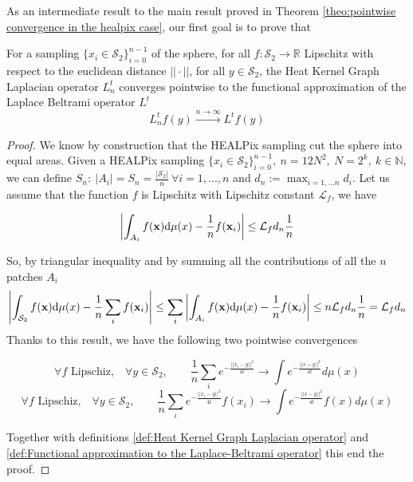 As an intermediate result to the main result proved in Theorem \ref{theo:pointwise convergence in the healpix case}, our first goal is to prove that 
\vspace{0.5cm}
\begin{prop}\label{prop:1}
	For a sampling $\{x_i\in\mathcal S_2\}_{i=0}^{n-1}$ of the sphere, for all $f: \mathcal S_2 \rightarrow \mathbb R$ Lipschitz with respect to the euclidean distance $||\cdot||$, for all $y\in\mathcal S_2$, the Heat Kernel Graph Laplacian operator $L^t_n$ converges pointwise to the functional approximation of the Laplace Beltrami operator $L^t$
	$$ L_n^tf(y)\xrightarrow{n\to\infty} L^tf(y)$$
\end{prop} 
\vspace{0.5cm}


\begin{proof}
	We know by construction that the HEALPix sampling cut the sphere into equal areas. Given a HEALPix sampling $\{x_i\in\mathcal S_2\}_{i=0}^{n-1},\ n=12N^2,\ N=2^k,\ k\in\mathbb N$, we can define $S_n: \ |A_i|=S_n=\frac{|\mathcal S_2|}{n}\ \forall i=1, ..., n$ and $d_n := \max_{i=1,...n}d_i$.
	Let us assume that the function $f$ is Lipschitz with Lipschitz constant $\mathcal L_f$, we have 
	
	$$\left| \int_{A_{i}}f({\bf x})\text{d}{\mu(x)} - \frac{1}{n}f(\mathbf x_i)\right| \leq \mathcal L_fd_{n}\frac{1}{n} $$

	So, by triangular inequality and by summing all the contributions of all the $n$ patches $A_i$
	$$\left| \int_{\mathcal S_2}f({\bf x})\text{d}{\mu(x)} - \frac{1}{n}\sum_i f(\mathbf x_i)\right| \leq \sum_i \left| \int_{A_{i}}f({\bf x})\text{d}{\mu(x)} - \frac{1}{n}f(\mathbf x_i)\right|\leq n  \mathcal L_fd_{n}\frac{1}{n} = \mathcal L_fd_{n}$$	
	Thanks to this result, we have the following two pointwise convergences
	
	$$\forall f \text{ Lipschiz,}\quad \forall y\in\mathcal S_2,  \quad\quad \frac{1}{n}\sum_i e^{-\frac{||x_i-y||^2}{4t}}\rightarrow \int e^{-\frac{||x-y||^2}{4t}}d\mu(x)$$
	$$\forall f \text{ Lipschiz,}\quad \forall y\in\mathcal S_2,  \quad\quad \frac{1}{n}\sum_i e^{-\frac{||x_i-y||^2}{4t}}f(x_i)\rightarrow \int e^{-\frac{||x-y||^2}{4t}}f(x)d\mu(x)$$
	
	Together with definitions \ref{def:Heat Kernel Graph Laplacian operator} and \ref{def:Functional approximation to the Laplace-Beltrami operator} this end the proof.
\end{proof}
\vspace{0.5cm}


